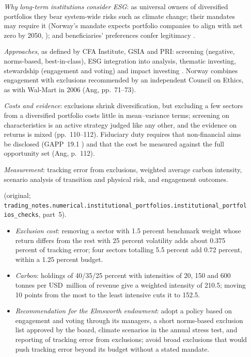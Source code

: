 \begin{qfmethod}\label{meth:institutional-esg-integration}
 \emph{Why long-term institutions consider ESG}: as universal owners of diversified portfolios they bear system-wide risks such as climate change; their mandates may require it (Norway's mandate expects portfolio companies to align with net zero by 2050, \citep[climate action plan]{nbim-gpfg-2026}); and beneficiaries' preferences confer legitimacy \citep[chap.~3, pp.~71--73, 112]{s7-ang}.

\emph{Approaches}, as defined by CFA Institute, GSIA and PRI: screening (negative, norms-based, best-in-class), ESG integration into analysis, thematic investing, stewardship (engagement and voting) and impact investing \citep[Tables~1--2, p.~7]{sustainable-investment-review-2022}. Norway combines engagement with exclusions recommended by an independent Council on Ethics, as with Wal-Mart in 2006 (Ang, pp.~71--73).

\emph{Costs and evidence}: exclusions shrink diversification, but excluding a few sectors from a diversified portfolio costs little in mean--variance terms; screening on characteristics is an active strategy judged like any other, and the evidence on returns is mixed (pp.~110--112). Fiduciary duty requires that non-financial aims be disclosed (GAPP~19.1 \citep[GAPP~19.1]{santiago-principles-2008}) and that the cost be measured against the full opportunity set (Ang, p.~112).

\emph{Measurement}: tracking error from exclusions, weighted average carbon intensity, scenario analysis of transition and physical risk, and engagement outcomes.

 (original; \nolinkurl{trading_notes.numerical.institutional_portfolios.institutional_portfolios_checks}, part~5).
\begin{itemize}
\item \emph{Exclusion cost}: removing a sector with 1.5 percent benchmark weight whose return differs from the rest with 25 percent volatility adds about 0.375 percent of tracking error; four sectors totalling 5.5 percent add 0.72 percent, within a 1.25 percent budget.
\item \emph{Carbon}: holdings of 40/35/25 percent with intensities of 20, 150 and 600 tonnes per USD~million of revenue give a weighted intensity of 210.5; moving 10 points from the most to the least intensive cuts it to 152.5.
\item \emph{Recommendation for the Elmsworth endowment}: adopt a policy based on engagement and voting through its managers, a short norms-based exclusion list approved by the board, climate scenarios in the annual stress test, and reporting of tracking error from exclusions; avoid broad exclusions that would push tracking error beyond its budget without a stated mandate.
\end{itemize}


\end{qfmethod}
